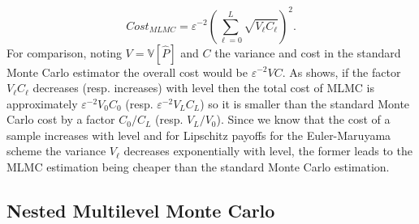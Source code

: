 \begin{equation}\label{total_cost_MLMC}
    Cost_{MLMC}=\varepsilon^{-2} \left( \sum_{\ell=0}^L \sqrt{V_\ell C_\ell}\right)^2.
\end{equation}
For comparison, noting $V=\mathbb{V}[\hat{P}]$ and $C$ the variance and cost in the standard Monte Carlo estimator the overall cost would be $\varepsilon^{-2} VC$. As  \cite{Giles_overview17} shows, if the factor $V_\ell C_\ell$ decreases (resp. increases) with level then the total cost of MLMC is approximately $\varepsilon^{-2} V_0 C_0$ (resp. $\varepsilon^{-2} V_L C_L$) so it is smaller than the standard Monte Carlo cost by a factor $C_0/C_L$ (resp. $V_L/V_0$). Since we know that the cost of a sample increases with level and for Lipschitz payoffs for the Euler-Maruyama scheme the variance $V_\ell$ decreases exponentially with level, the former leads to the MLMC estimation being cheaper than the standard Monte Carlo estimation.


\subsection{Nested Multilevel Monte Carlo}

